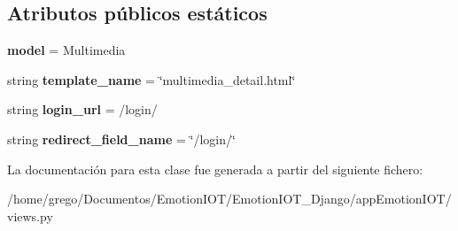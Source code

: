 \subsection*{Atributos públicos estáticos}
\begin{DoxyCompactItemize}
\item 
{\bfseries model} = Multimedia\hypertarget{classappEmotionIOT_1_1views_1_1Multimedia__detail_abf1d36156f1ab881ebab3857235c41bf}{}\label{classappEmotionIOT_1_1views_1_1Multimedia__detail_abf1d36156f1ab881ebab3857235c41bf}

\item 
string {\bfseries template\+\_\+name} = \char`\"{}multimedia\+\_\+detail.\+html\char`\"{}\hypertarget{classappEmotionIOT_1_1views_1_1Multimedia__detail_a5f85b4a41dee2596b3632de2bd347104}{}\label{classappEmotionIOT_1_1views_1_1Multimedia__detail_a5f85b4a41dee2596b3632de2bd347104}

\item 
string {\bfseries login\+\_\+url} = \textquotesingle{}/login/\textquotesingle{}\hypertarget{classappEmotionIOT_1_1views_1_1Multimedia__detail_afc7afe230cd4d89e3b96eefa31b5149a}{}\label{classappEmotionIOT_1_1views_1_1Multimedia__detail_afc7afe230cd4d89e3b96eefa31b5149a}

\item 
string {\bfseries redirect\+\_\+field\+\_\+name} = \char`\"{}/login/\char`\"{}\hypertarget{classappEmotionIOT_1_1views_1_1Multimedia__detail_aceb6ea686ade46bdae8cddf9632565ff}{}\label{classappEmotionIOT_1_1views_1_1Multimedia__detail_aceb6ea686ade46bdae8cddf9632565ff}

\end{DoxyCompactItemize}


La documentación para esta clase fue generada a partir del siguiente fichero\+:\begin{DoxyCompactItemize}
\item 
/home/grego/\+Documentos/\+Emotion\+I\+O\+T/\+Emotion\+I\+O\+T\+\_\+\+Django/app\+Emotion\+I\+O\+T/views.\+py\end{DoxyCompactItemize}
